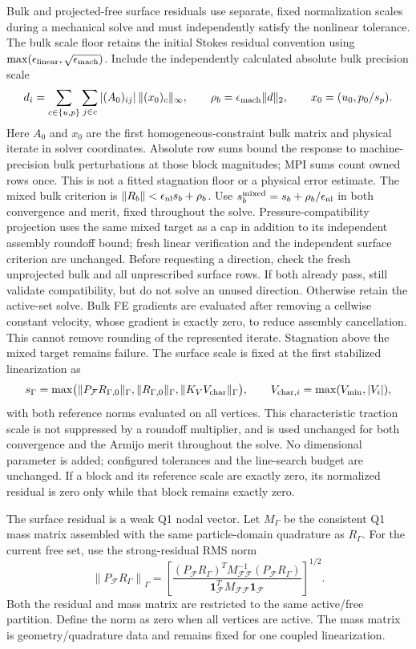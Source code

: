 \documentclass[11pt]{article}
\begin{document}
Bulk and projected-free surface residuals use separate, fixed normalization
scales during a mechanical solve and must independently satisfy the nonlinear
tolerance. The bulk scale floor retains the initial Stokes residual convention
using $\max(\epsilon_{\rm linear},\sqrt{\epsilon_{\rm mach}})$.
Include the independently calculated absolute bulk precision scale
\[
 d_i=\sum_{c\in\{u,p\}}\sum_{j\in c}|(A_0)_{ij}|\,
                  \|(x_0)_c\|_\infty,
 \qquad \rho_b=\epsilon_{\rm mach}\|d\|_2,
 \qquad x_0=(u_0,p_0/s_p).
\]
Here $A_0$ and $x_0$ are the first homogeneous-constraint bulk matrix and
physical iterate in solver coordinates. Absolute row sums bound the response
to machine-precision bulk perturbations at those block magnitudes; MPI sums
count owned rows once. This is not a fitted stagnation floor or a physical
error estimate. The mixed bulk criterion is
$\|R_b\|<\epsilon_{\rm nl}s_b+\rho_b$. Use
$s_b^{\rm mixed}=s_b+\rho_b/\epsilon_{\rm nl}$ in both convergence and merit,
fixed throughout the solve. Pressure-compatibility projection uses the same
mixed target as a cap in addition to its independent assembly roundoff bound;
fresh linear verification and the independent surface criterion are unchanged.
Before requesting a direction, check the fresh unprojected bulk and all
unprescribed surface rows. If both already pass, still validate compatibility,
but do not solve an unused direction. Otherwise retain the active-set solve.
Bulk FE gradients are evaluated after
removing a cellwise constant velocity, whose gradient is exactly zero, to
reduce assembly cancellation. This cannot remove rounding of the represented
iterate. Stagnation above the mixed target remains failure.
The surface scale is fixed at the first stabilized linearization as
\[
s_\Gamma=\max\bigl(\|P_{\mathcal F}R_{\Gamma,0}\|_\Gamma,
                     \|R_{\Gamma,0}\|_\Gamma,
                     \|K_V V_{\rm char}\|_\Gamma\bigr),\qquad
V_{{\rm char},i}=\max(V_{\min},|V_i|),
\]
with both reference norms evaluated on all vertices. This characteristic
traction scale is not suppressed by a roundoff multiplier, and is used
unchanged for both convergence and the Armijo merit throughout the solve.
No dimensional parameter is added; configured tolerances and the line-search
budget are unchanged. If a block and its reference scale are exactly zero,
its normalized residual is zero only while that block remains exactly zero.

The surface residual is a weak Q1 nodal vector. Let $M_\Gamma$ be the
consistent Q1 mass matrix assembled with the same particle-domain quadrature
as $R_\Gamma$. For the current free set, use the strong-residual RMS norm
\begin{equation}
 \left\|P_{\mathcal F}R_\Gamma\right\|_\Gamma
 =\left[
 \frac{(P_{\mathcal F}R_\Gamma)^T
 M_{\mathcal F\mathcal F}^{-1}
 (P_{\mathcal F}R_\Gamma)}
 {{\boldsymbol 1}_{\mathcal F}^T
 M_{\mathcal F\mathcal F}{\boldsymbol 1}_{\mathcal F}}
 \right]^{1/2}.
\end{equation}
Both the residual and mass matrix are restricted to the same active/free
partition. Define the norm as zero when all vertices are active. The mass
matrix is geometry/quadrature data and remains fixed for one coupled
linearization.
\end{document}

